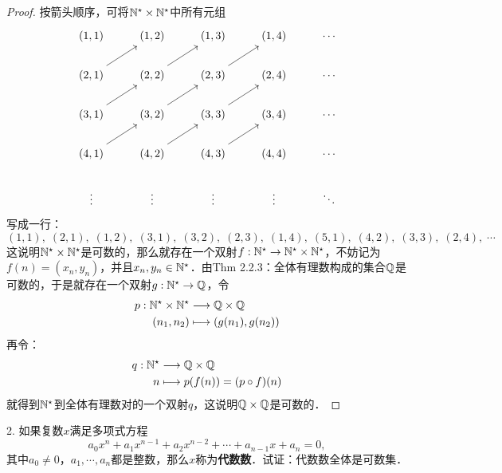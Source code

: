 \begin{proof}
按箭头顺序，可将$\mathbb{N}^\star \times \mathbb{N}^\star$中所有元组
    \begin{equation}
        \begin{tikzcd}
            (1,1) & (1,2) & (1,3) & (1,4) & \cdots \\
            (2,1) \arrow[ur] & (2,2) \arrow[ur] & (2,3) \arrow[ur] & (2,4) & \cdots \\
            (3,1) \arrow[ur] & (3,2) \arrow[ur] & (3,3) \arrow[ur] & (3,4) & \cdots \\
            (4,1) \arrow[ur] & (4,2) \arrow[ur] & (4,3) \arrow[ur] & (4,4) & \cdots \\
            \vdots & \vdots & \vdots & \vdots & \ddots
        \end{tikzcd}
    \end{equation}
写成一行：
\begin{equation}
    (1,1), \; (2,1), \; (1,2), \; (3,1), \; (3,2), \; (2,3), \; (1,4), \; (5,1), \; (4,2), \; (3,3), \; (2,4), \; \cdots
\end{equation}
这说明$\mathbb{N}^\star \times \mathbb{N}^\star$是可数的，那么就存在一个双射$f: \mathbb{N}^\star \to \mathbb{N}^\star \times \mathbb{N}^\star$，不妨记为$f(n) = (x_n, y_n)$，并且$x_n, y_n \in \mathbb{N}^\star$．由Thm 2.2.3：全体有理数构成的集合$\mathbb{Q}$是可数的，于是就存在一个双射$g: \mathbb{N}^\star \to \mathbb{Q}$，令
\begin{align}
    p: \mathbb{N}^\star \times \mathbb{N}^\star &\longrightarrow \mathbb{Q} \times \mathbb{Q} \\
    (n_1, n_2) &\longmapsto (g(n_1), g(n_2))
\end{align}
再令：
\begin{align}
    q: \mathbb{N}^\star &\longrightarrow \mathbb{Q} \times \mathbb{Q} \\
    n &\longmapsto p(f(n)) = (p \circ f) (n)
\end{align}
就得到$\mathbb{N}^\star$到全体有理数对的一个双射$q$，这说明$\mathbb{Q} \times \mathbb{Q}$是可数的．
\end{proof}

2. 如果复数$x$满足多项式方程
\begin{equation}
    a_0 x^n + a_1 x^{n-1} + a_2 x^{n-2} + \cdots + a_{n-1} x + a_{n} = 0,
\end{equation}
其中$a_0 \neq 0$，$a_1, \cdots, a_n$都是整数，那么$x$称为{\bfseries{代数数}}．试证：代数数全体是可数集．

